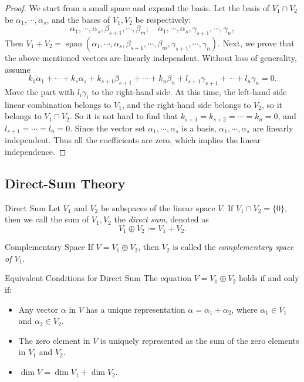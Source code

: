 \begin{proof}
  We start from a small space and expand the basis.
  Let the basis of $V_1 \cap V_2$ be $\alpha_1,\cdots,\alpha_s$,
  and the bases of $V_1, V_2$ be respectively:
  \begin{equation}
    \alpha_1,\cdots,\alpha_s,\beta_{s+1},\cdots,\beta_m; \quad 
    \alpha_1,\cdots,\alpha_s,\gamma_{s+1},\cdots,\gamma_n,
  \end{equation}
  Then $V_1 + V_2 = \operatorname{span}(\alpha_1,\cdots,\alpha_s,\beta_{s+1},\cdots,\beta_m,\gamma_{s+1},\cdots,\gamma_n)$.
  Next, we prove that the above-mentioned vectors are linearly independent.
  Without loss of generality, assume
  \begin{equation}
    k_1\alpha_1+\cdots+k_s\alpha_s+k_{s+1}\beta_{s+1}+\cdots+k_n\beta_n+l_{s+1}\gamma_{s+1}+\cdots+l_n\gamma_n=0.
  \end{equation}
  Move the part with $l_i \gamma_i$ to the right-hand side.
  At this time, the left-hand side linear combination belongs to $V_1$,
  and the right-hand side belongs to $V_2$,
  so it belongs to $V_1 \cap V_2$.
  So it is not hard to find that $k_{s+1} = k_{s+2} = \cdots = k_n = 0$,
  and $l_{s+1} = \cdots = l_n = 0$.
  Since the vector set $\alpha_1, \cdots, \alpha_s$ is a basis,
  $\alpha_1,\cdots,\alpha_s$ are linearly independent. Thus all the coefficients are zero,
  which implies the linear independence.
\end{proof}


\subsection{Direct-Sum Theory}

\begin{definition}{Direct Sum}{}
  Let $V_1$ and $V_2$ be subspaces of the linear space $V$.
  If $V_1 \cap V_2 = \{0\}$,
  then we call the sum of $V_1, V_2$ the \emph{direct sum},
  denoted as
  \begin{equation}
    V_1 \oplus V_2 := V_1 + V_2.
  \end{equation}
\end{definition}

\begin{definition}{Complementary Space}{}
  If $V = V_1 \oplus V_2$,
  then $V_2$ is called the \emph{complementary space of $V_1$}.
\end{definition}

\begin{proposition}{Equivalent Conditions for Direct Sum}{}
  The equation $V = V_1 \oplus V_2$ holds if and only if:
  \begin{itemize}
  \item Any vector $\alpha$ in $V$ has a unique representation $\alpha =
    \alpha_1 + \alpha_2$, where $\alpha_1 \in V_1$ and $\alpha_2 \in V_2$.
  \item The zero element in $V$ is uniquely represented as the sum of
    the zero elements in $V_1$ and $V_2$.
  \item $\operatorname{dim} V = \operatorname{dim} V_1 + \operatorname{dim} V_2$.
  \end{itemize}
\end{proposition}

